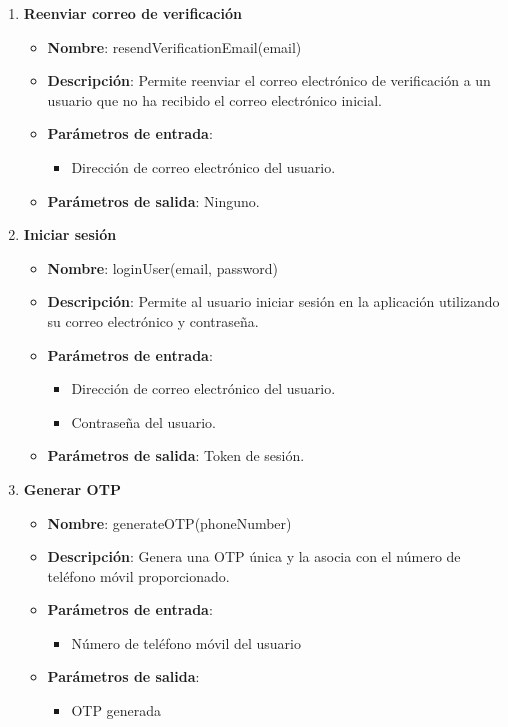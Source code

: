 \begin{enumerate}[label=SOP-\protect\twodigits{\arabic*}:, align=left, leftmargin=*]
\item \textbf{Reenviar correo de verificación}
\begin{itemize}
\item \textbf{Nombre}: resendVerificationEmail(email)
\item \textbf{Descripción}: Permite reenviar el correo electrónico de verificación a un usuario que no ha recibido el correo electrónico inicial.
\item \textbf{Parámetros de entrada}:
\begin{itemize}
\item Dirección de correo electrónico del usuario.
\end{itemize}
\item \textbf{Parámetros de salida}: Ninguno.
\end{itemize}

\item \textbf{Iniciar sesión}
\begin{itemize}
\item \textbf{Nombre}: loginUser(email, password)
\item \textbf{Descripción}: Permite al usuario iniciar sesión en la aplicación utilizando su correo electrónico y contraseña.
\item \textbf{Parámetros de entrada}:
\begin{itemize}
\item Dirección de correo electrónico del usuario.
\item Contraseña del usuario.
\end{itemize}
\item \textbf{Parámetros de salida}: Token de sesión.
\end{itemize}

\item \textbf{Generar OTP}
\begin{itemize}
\item \textbf{Nombre}: generateOTP(phoneNumber)
\item \textbf{Descripción}: Genera una OTP única y la asocia con el número de teléfono móvil proporcionado.
\item \textbf{Parámetros de entrada}:
\begin{itemize}
\item Número de teléfono móvil del usuario
\end{itemize}
\item \textbf{Parámetros de salida}:
\begin{itemize}
\item OTP generada
\end{itemize}
\end{itemize}


\end{enumerate}
